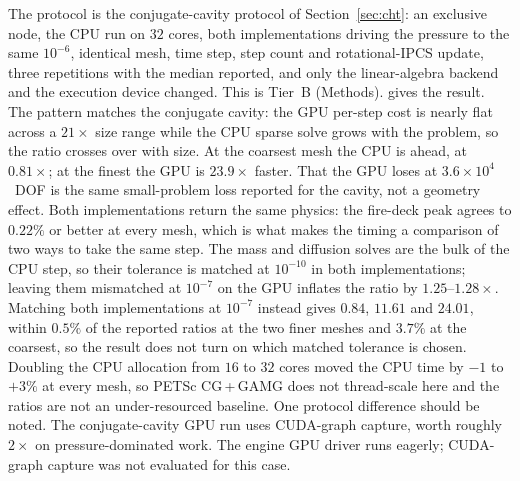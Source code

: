 The protocol is the conjugate-cavity protocol of Section~\ref{sec:cht}: an exclusive node,
the CPU run on $32$ cores, both implementations driving the pressure to the same $10^{-6}$, identical
mesh, time step, step count and rotational-IPCS update, three repetitions with the median
reported, and only the linear-algebra backend and the execution device changed. This is Tier~B (Methods).  gives the result. The pattern matches the conjugate
cavity: the GPU per-step cost is nearly flat across a $21\times$ size range while the CPU
sparse solve grows with the problem, so the ratio crosses over with size. At the coarsest mesh the
CPU is ahead, at $0.81\times$; at the finest the GPU is $23.9\times$ faster. That the GPU loses at $3.6\times10^{4}$~DOF is the same
small-problem loss reported for the cavity, not a geometry effect. Both implementations return the same physics: the fire-deck peak agrees to $0.22\%$ or
better at every mesh, which is what makes the timing a comparison of two ways to take the
same step. The mass and diffusion solves are the bulk of the CPU step, so their tolerance
is matched at $10^{-10}$ in both implementations; leaving them mismatched at $10^{-7}$ on
the GPU inflates the ratio by $1.25$--$1.28\times$. Matching both implementations at
$10^{-7}$ instead gives $0.84$, $11.61$ and $24.01$, within $0.5\%$ of the reported ratios
at the two finer meshes and $3.7\%$ at the coarsest, so the result does not turn on which
matched tolerance is chosen. Doubling the CPU allocation from $16$ to $32$ cores moved the
CPU time by $-1$ to $+3\%$ at every mesh, so PETSc CG\,+\,GAMG does not thread-scale here
and the ratios are not an under-resourced baseline. One protocol difference should be
noted. The conjugate-cavity GPU run uses
CUDA-graph capture, worth roughly $2\times$ on pressure-dominated work. The engine GPU driver
runs eagerly; CUDA-graph capture was not evaluated for this case.
